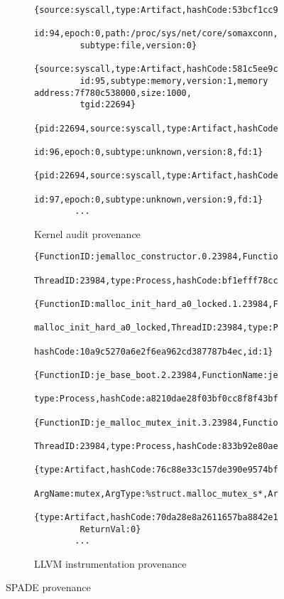 \begin{figure}[t]

  \begin{subfigure}[b]{\columnwidth}
    {
      \scriptsize
      \begin{Verbatim}[gobble=8]
        {source:syscall,type:Artifact,hashCode:53bcf1cc966af740e6947b0e9c2a339b,
         id:94,epoch:0,path:/proc/sys/net/core/somaxconn,permissions:0644,
         subtype:file,version:0}
        {source:syscall,type:Artifact,hashCode:581c5ee9cdcf7389575329bf82952436,
         id:95,subtype:memory,version:1,memory address:7f780c538000,size:1000,
         tgid:22694}
        {pid:22694,source:syscall,type:Artifact,hashCode:aacd358e7170deccc70c2f88b52d4cef,
         id:96,epoch:0,subtype:unknown,version:8,fd:1}
        {pid:22694,source:syscall,type:Artifact,hashCode:c86147ac594fd4f80b476a6a928aaf56,
         id:97,epoch:0,subtype:unknown,version:9,fd:1}
        ...
      \end{Verbatim}
    }
    \caption{Kernel audit provenance}
  \end{subfigure}

  \vspace{0.5cm}

  \begin{subfigure}[b]{\columnwidth}
    {
      \scriptsize
      \begin{Verbatim}[gobble=8]
        {FunctionID:jemalloc_constructor.0.23984,FunctionName:jemalloc_constructor,
         ThreadID:23984,type:Process,hashCode:bf1efff78cc36fca4e34ba0b7bdea49d,id:0}
        {FunctionID:malloc_init_hard_a0_locked.1.23984,FunctionName:
         malloc_init_hard_a0_locked,ThreadID:23984,type:Process,
         hashCode:10a9c5270a6e2f6ea962cd387787b4ec,id:1}
        {FunctionID:je_base_boot.2.23984,FunctionName:je_base_boot,ThreadID:23984,
         type:Process,hashCode:a8210dae28f03bf0cc8f8f43bff1b0ec,id:2}
        {FunctionID:je_malloc_mutex_init.3.23984,FunctionName:je_malloc_mutex_init,
         ThreadID:23984,type:Process,hashCode:833b92e80ae64062350b522d285a08b6,id:3}
        {type:Artifact,hashCode:76c88e33c157de390e9574bf0196b3de,id:4,
         ArgName:mutex,ArgType:%struct.malloc_mutex_s*,ArgVal:0x7fed42d84520}
        {type:Artifact,hashCode:70da28e8a2611657ba8842e198f401db,id:5,ReturnType:i1,
         ReturnVal:0}
        ...
      \end{Verbatim}
    }
    \caption{LLVM instrumentation provenance}
  \end{subfigure}
  \caption{SPADE provenance}
\end{figure}

